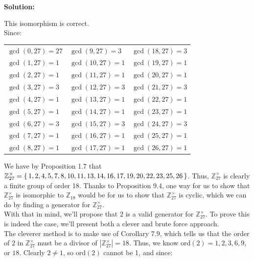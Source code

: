 \documentclass{article}
\newenvironment{solution}{
	\vspace{.5em}
	\par
	\begin{adjustwidth}{1.5em}{}
	\textbf{{Solution:}}
	\par
	\vspace{.5em}
}{
	\vspace{1em}
	\end{adjustwidth}
	\setcounter{step}{0}
	\newpage
}
\newcounter{step}
\newcommand{\ord}[1]{\text{ord}({#1})}
\begin{document}
\begin{solution}
	This isomorphism is correct. \\

	Since:

	\vspace{1em}

	\begin{tabularx}{\linewidth}{Y Y Y}
		$\gcd(0, 27) = 27$ & $\gcd(9, 27) = 3$ & $\gcd(18, 27) = 3$ \\[8pt]
		$\boxed{\gcd(1, 27) = 1}$ & $\boxed{\gcd(10, 27) = 1}$ & $\boxed{\gcd(19, 27) = 1}$ \\[8pt]
		$\boxed{\gcd(2, 27) = 1}$ & $\boxed{\gcd(11, 27) = 1}$ & $\boxed{\gcd(20, 27) = 1}$ \\[8pt]
		$\gcd(3, 27) = 3$ & $\gcd(12, 27) = 3$ & $\gcd(21, 27) = 3$ \\[8pt]
		$\boxed{\gcd(4, 27) = 1}$ & $\boxed{\gcd(13, 27) = 1}$ & $\boxed{\gcd(22, 27) = 1}$ \\[8pt]
		$\boxed{\gcd(5, 27) = 1}$ & $\boxed{\gcd(14, 27) = 1}$ & $\boxed{\gcd(23, 27) = 1}$ \\[8pt]
		$\gcd(6, 27) = 3$ & $\gcd(15, 27) = 3$ & $\gcd(24, 27) = 3$ \\[8pt]
		$\boxed{\gcd(7, 27) = 1}$ & $\boxed{\gcd(16, 27) = 1}$ & $\boxed{\gcd(25, 27) = 1}$ \\[8pt]
		$\boxed{\gcd(8, 27) = 1}$ & $\boxed{\gcd(17, 27) = 1}$ & $\boxed{\gcd(26, 27) = 1}$ \\[8pt]
	\end{tabularx}

	\vspace{1em}

	We have by Proposition 1.7 that $\mathbb{Z}^{\times}_{27} = \set{1, 2, 4, 5, 7, 8, 10, 11, 13, 14, 16, 17, 19, 20, 22, 23, 25, 26}$. Thus, $\mathbb{Z}^{\times}_{27}$ is clearly a finite group of order 18. Thanks to Proposition 9.4, one way for us to show that $\mathbb{Z}^{\times}_{27}$ is isomorphic to $\mathbb{Z}_{18}$ would be for us to show that $\mathbb{Z}^{\times}_{27}$ is cyclic, which we can do by finding a generator for $\mathbb{Z}^{\times}_{27}$. \\

	With that in mind, we'll propose that $2$ is a valid generator for $\mathbb{Z}^{\times}_{27}$. To prove this is indeed the case, we'll present both a clever and brute force approach. \\

	The cleverer method is to make use of Corollary 7.9, which tells us that the order of $2$ in $\mathbb{Z}^{\times}_{27}$ must be a divisor of $|\mathbb{Z}^{\times}_{27}| = 18$. Thus, we know $\ord{2} = 1, 2, 3, 6, 9$, or $18$. Clearly $2 \neq 1 $, so $\ord{2}$ cannot be 1, and since:
	\vspace{1em}


\end{solution}
\end{document}
